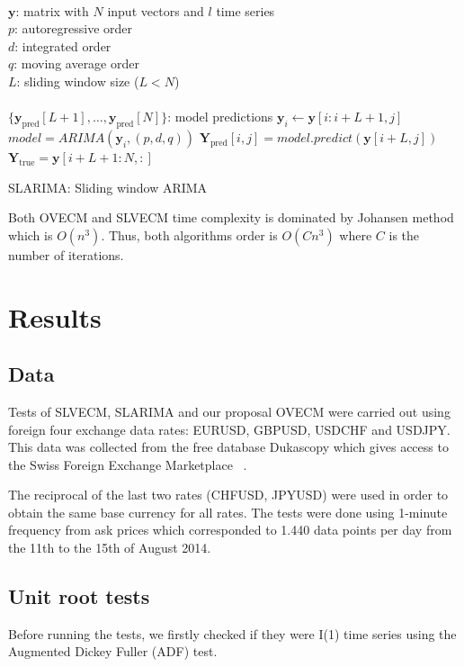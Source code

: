 \begin{algorithm}[ht]
\begin{algorithmic}[1]
\REQUIRE $\,$ \\
$\mathbf{y}$: matrix with $N$ input vectors and $l$ time series\\
$p$: autoregressive order \\
$d$: integrated order\\
$q$: moving average order\\
$L$: sliding window size ($L<N$) \\
\ENSURE  $\,$ \\
$\{ \mathbf{y}_{\text{pred}}[L+1],\dots,\mathbf{y}_{\text{pred}}[N]\}$: model predictions 
    \STATE $\mathbf{y}_i \gets \mathbf{y}[i:i+L+1,j]$
        \STATE $model = ARIMA(\mathbf{y}_i, (p,d,q))$
        \STATE $\mathbf{Y}_{\text{pred}}[i,j] = model.predict(\mathbf{y}[i+L,j])$
\ENDFOR
\ENDFOR
\STATE $\mathbf{Y}_{\text{true}} = \mathbf{y}[i+L+1:N,:] $
\end{algorithmic}
\caption{SLARIMA: Sliding window ARIMA}
\label{alg:SLARIMA}
\end{algorithm}

Both OVECM and SLVECM time complexity is dominated by Johansen method which is
$O(n^3)$. Thus, both algorithms order is $O(Cn^3)$ where $C$ is the number of
iterations. 

\section{Results} \label{sec:52results}

\subsection{Data} \label{sec:unitroot}
Tests of SLVECM, SLARIMA and our proposal OVECM were carried out using foreign
four exchange data rates: EURUSD, GBPUSD, USDCHF and USDJPY. This data was
collected from the free database Dukascopy which gives access to the Swiss
Foreign Exchange Marketplace ~\cite{Dukascopy2014}.

The reciprocal of the last two rates (CHFUSD, JPYUSD) were used in order to
obtain the same base currency for all rates.  The tests were done using
1-minute frequency from ask prices which corresponded to 1.440 data points per
day from the 11th to the 15th of August 2014.

\subsection{Unit root tests} \label{sec:unitroot}
Before running the tests, we firstly checked if they were I(1) time series
using the Augmented Dickey Fuller (ADF) test.

